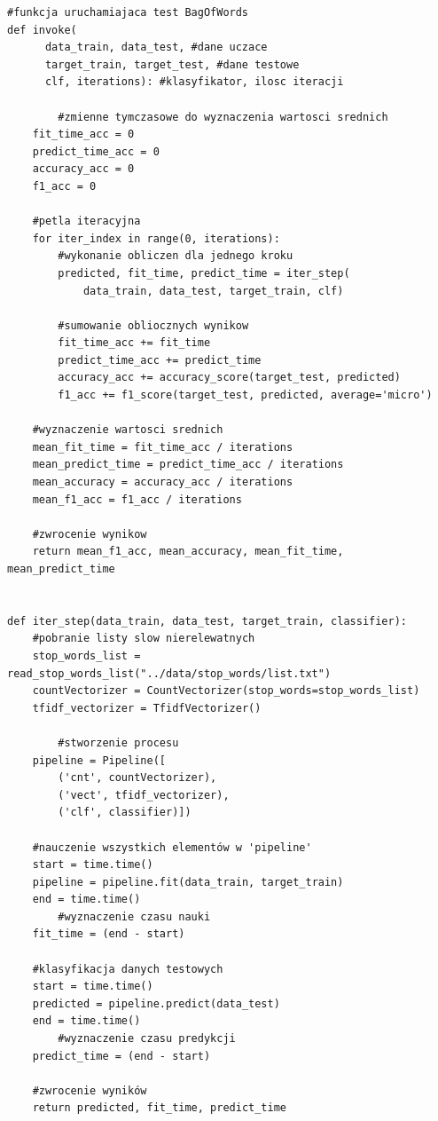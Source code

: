 \begin{lstlisting}[style=pythonStyle]
#funkcja uruchamiajaca test BagOfWords
def invoke(
      data_train, data_test, #dane uczace
      target_train, target_test, #dane testowe
      clf, iterations): #klasyfikator, ilosc iteracji
    
    	#zmienne tymczasowe do wyznaczenia wartosci srednich
    fit_time_acc = 0 
    predict_time_acc = 0
    accuracy_acc = 0
    f1_acc = 0

	#petla iteracyjna
    for iter_index in range(0, iterations):
    	#wykonanie obliczen dla jednego kroku
        predicted, fit_time, predict_time = iter_step(
        	data_train, data_test, target_train, clf)
            
        #sumowanie obliocznych wynikow
        fit_time_acc += fit_time
        predict_time_acc += predict_time
        accuracy_acc += accuracy_score(target_test, predicted)
        f1_acc += f1_score(target_test, predicted, average='micro')

	#wyznaczenie wartosci srednich
    mean_fit_time = fit_time_acc / iterations
    mean_predict_time = predict_time_acc / iterations
    mean_accuracy = accuracy_acc / iterations
    mean_f1_acc = f1_acc / iterations

	#zwrocenie wynikow
    return mean_f1_acc, mean_accuracy, mean_fit_time, mean_predict_time


def iter_step(data_train, data_test, target_train, classifier):
	#pobranie listy slow nierelewatnych
    stop_words_list = read_stop_words_list("../data/stop_words/list.txt")
    countVectorizer = CountVectorizer(stop_words=stop_words_list)
    tfidf_vectorizer = TfidfVectorizer()
    
    	#stworzenie procesu
    pipeline = Pipeline([
    	('cnt', countVectorizer),
        ('vect', tfidf_vectorizer),
        ('clf', classifier)])

	#nauczenie wszystkich elementów w 'pipeline'
    start = time.time()
    pipeline = pipeline.fit(data_train, target_train)
    end = time.time()
    	#wyznaczenie czasu nauki
    fit_time = (end - start)

	#klasyfikacja danych testowych
    start = time.time()
    predicted = pipeline.predict(data_test)
    end = time.time()
    	#wyznaczenie czasu predykcji
    predict_time = (end - start)

	#zwrocenie wyników
    return predicted, fit_time, predict_time

\end{lstlisting}

